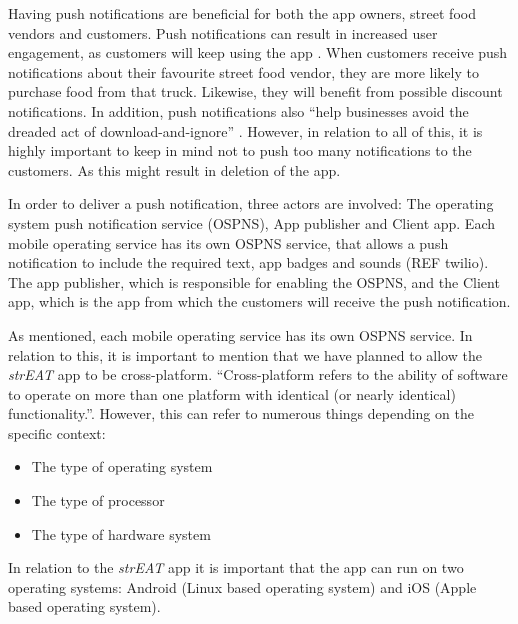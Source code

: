 Having push notifications are beneficial for both the app owners, street food vendors and customers. Push notifications can result in increased user engagement, as customers will keep using the app \cite{PushnotificationsMatters}. When customers receive push notifications about their favourite street food vendor, they are more likely to purchase food from that truck. Likewise, they will benefit from possible discount notifications. In addition, push notifications also “help businesses avoid the dreaded act of download-and-ignore” \cite{WhatArePushnotifications}. However, in relation to all of this, it is highly important to keep in mind not to push too many notifications to the customers. As this might result in deletion of the app.

In order to deliver a push notification, three actors are involved: The operating system push notification service (OSPNS), App publisher and Client app. Each mobile operating service has its own OSPNS service, that allows a push notification to include the required text, app badges and sounds (REF twilio). The app publisher, which is responsible for enabling the OSPNS, and the Client app, which is the app from which the customers will receive the push notification. \cite{WhatArePushnotifications}

As mentioned, each mobile operating service has its own OSPNS service. In relation to this, it is important to mention that we have planned to allow the \textit{strEAT} app to be cross-platform. “Cross-platform refers to the ability of software to operate on more than one platform with identical (or nearly identical) functionality.”\cite{CrossPlatform}. However, this can refer to numerous things depending on the specific context:

\begin{itemize}
\item The type of operating system
\item The type of processor
\item The type of hardware system \cite{CrossPlatform}
\end{itemize}

In relation to the \textit{strEAT} app it is important that the app can run on two operating systems: Android (Linux based operating system) and iOS (Apple based operating system).
